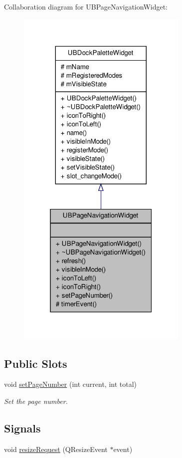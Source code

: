 Collaboration diagram for U\-B\-Page\-Navigation\-Widget\-:
\nopagebreak
\begin{figure}[H]
\begin{center}
\leavevmode
\includegraphics[width=232pt]{d4/d50/class_u_b_page_navigation_widget__coll__graph}
\end{center}
\end{figure}
\subsection*{Public Slots}
\begin{DoxyCompactItemize}
\item 
void \hyperlink{class_u_b_page_navigation_widget_abb36254c65368f6f40b2d9dc84948574}{set\-Page\-Number} (int current, int total)
\begin{DoxyCompactList}\small\item\em Set the page number. \end{DoxyCompactList}\end{DoxyCompactItemize}
\subsection*{Signals}
\begin{DoxyCompactItemize}
\item 
void \hyperlink{class_u_b_page_navigation_widget_adef784f6e27a1a2ed08e54fab89300d6}{resize\-Request} (Q\-Resize\-Event $\ast$event)
\end{DoxyCompactItemize}

